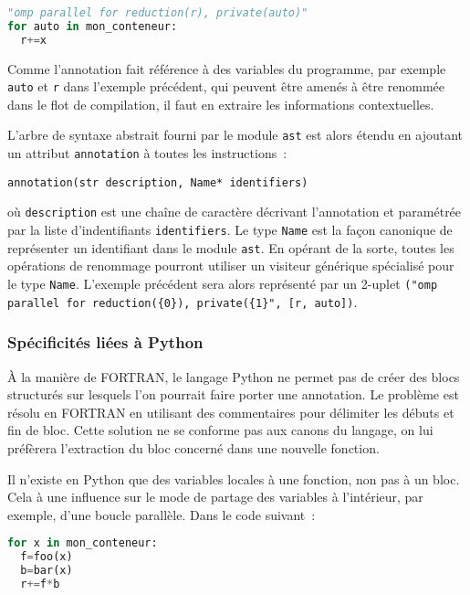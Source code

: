 \documentclass[renpar]{compas2013}
\begin{document}
\begin{lstlisting}[language=python]
"omp parallel for reduction(r), private(auto)"
for auto in mon_conteneur:
  r+=x
\end{lstlisting}

Comme l'annotation fait référence à des variables du programme, par exemple
\texttt{auto} et \texttt{r} dans l'exemple précédent, qui peuvent être amenés à
être renommée dans le flot de compilation, il faut en extraire les informations contextuelles.

L'arbre de syntaxe abstrait fourni par le module \texttt{ast} est alors
étendu en ajoutant un attribut \texttt{annotation} à toutes les
instructions~:

\begin{lstlisting}
annotation(str description, Name* identifiers)
\end{lstlisting}

\noindent où \texttt{description} est une chaîne de caractère décrivant
l'annotation et paramétrée par la liste d'indentifiants \texttt{identifiers}.
Le type \texttt{Name} est la façon canonique de représenter un identifiant dans
le module \texttt{ast}.  En opérant de la sorte, toutes les opérations de
renommage pourront utiliser un visiteur générique spécialisé pour le type
\texttt{Name}. L'exemple précédent sera alors représenté par un 2-uplet
\texttt{("omp parallel for reduction(\{0\}), private(\{1\}", [r, auto])}.

\subsubsection{Spécificités liées à Python}

À la manière de FORTRAN, le langage Python ne permet pas de créer des
blocs structurés sur lesquels l'on pourrait faire porter une annotation.
Le problème est résolu en FORTRAN en utilisant des commentaires pour
délimiter les débuts et fin de bloc. Cette solution ne se conforme pas aux
canons du langage, on lui préfèrera l'extraction du bloc concerné dans une
nouvelle fonction.

Il n'existe en Python que des variables locales à une fonction, non pas à
un bloc. Cela à une influence sur le mode de partage des variables à
l'intérieur, par exemple, d'une boucle parallèle. Dans le code suivant~:

\begin{lstlisting}[language=python]
for x in mon_conteneur:
  f=foo(x)
  b=bar(x)
  r+=f*b
\end{lstlisting}
\end{document}
